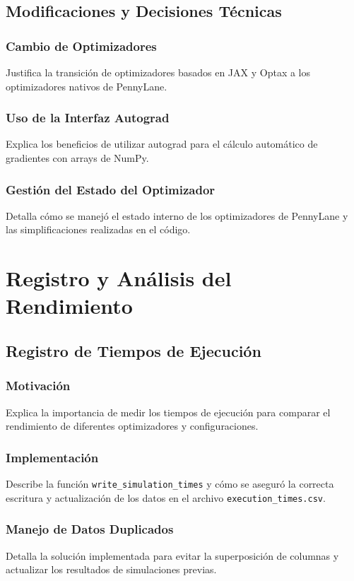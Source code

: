 \subsection{Modificaciones y Decisiones Técnicas}

\subsubsection{Cambio de Optimizadores}
Justifica la transición de optimizadores basados en JAX y Optax a los optimizadores nativos de PennyLane.

\subsubsection{Uso de la Interfaz Autograd}
Explica los beneficios de utilizar autograd para el cálculo automático de gradientes con arrays de NumPy.

\subsubsection{Gestión del Estado del Optimizador}
Detalla cómo se manejó el estado interno de los optimizadores de PennyLane y las simplificaciones realizadas en el código.

\section{Registro y Análisis del Rendimiento}

\subsection{Registro de Tiempos de Ejecución}

\subsubsection{Motivación}
Explica la importancia de medir los tiempos de ejecución para comparar el rendimiento de diferentes optimizadores y configuraciones.

\subsubsection{Implementación}
Describe la función \texttt{write\_simulation\_times} y cómo se aseguró la correcta escritura y actualización de los datos en el archivo \texttt{execution\_times.csv}.

\subsubsection{Manejo de Datos Duplicados}
Detalla la solución implementada para evitar la superposición de columnas y actualizar los resultados de simulaciones previas.

